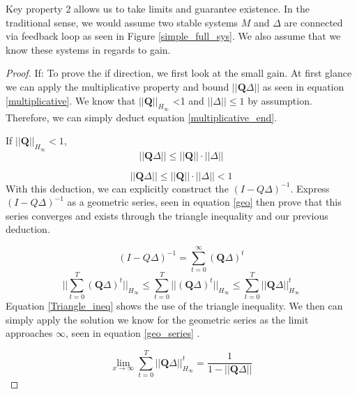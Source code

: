\documentclass{article}[12pt]
\begin{document}
\noindent Key property 2 allows us to take limits and guarantee existence. 
In the traditional sense, we would assume two stable systems $M$ and $\Delta$ are connected via feedback loop as seen in Figure \ref{simple_full_sys}. We also assume that we know these systems in regards to gain.

\begin{proof}

If: To prove the if direction, we first look at the small gain. At first glance we can apply the multiplicative property and bound $||\boldsymbol{Q} \Delta||$ as seen in equation \ref{multiplicative}. We know that $||\boldsymbol{Q}||_{H_\infty}$ \textless 1 and $||\Delta|| \leq 1$ by assumption. Therefore, we can simply deduct  equation \ref{multiplicative_end}.

If $||\boldsymbol{Q}||_{H_\infty} < 1$,
\begin{equation}
    ||\boldsymbol{Q} \Delta|| \leq ||\boldsymbol{Q}|| \cdot ||\Delta||
    \label{multiplicative}
\end{equation}

\begin{equation}
    ||\boldsymbol{Q} \Delta|| \leq ||\boldsymbol{Q}|| \cdot ||\Delta|| < 1
    \label{multiplicative_end}
\end{equation}
With this deduction, we can explicitly construct the $(I-Q\Delta)^{-1}$. Express $(I-Q\Delta)^{-1}$ as a geometric series, seen in equation \ref{geo} then prove that this series converges and exists through the triangle inequality and our previous deduction. 

\begin{equation}
    (I-Q\Delta)^{-1} = \sum_{t=0}^\infty (\boldsymbol{Q}\Delta)^t
    \label{geo}
\end{equation}
\begin{equation}
    ||\sum_{t=0}^T (\boldsymbol{Q}\Delta)^t||_{H_\infty} \leq \sum_{t=0}^T ||(\boldsymbol{Q}\Delta)^t||_{H_\infty} \leq \sum_{t=0}^T ||\boldsymbol{Q}\Delta||^t_{H_\infty}
    \label{Triangle_ineq}
\end{equation}
Equation \ref{Triangle_ineq} shows the use of the triangle inequality. We then can simply apply the solution we know for the geometric series as the limit approaches $\infty$, seen in equation \ref{geo_series}  . 

\begin{equation}
    \label{geo_series}
    \lim_{x\to\infty} \sum_{t=0}^T ||\boldsymbol{Q}\Delta||^t_{H_\infty} = \frac{1}{1-||\boldsymbol{Q}\Delta||}
\end{equation}


\end{proof}
\end{document}
